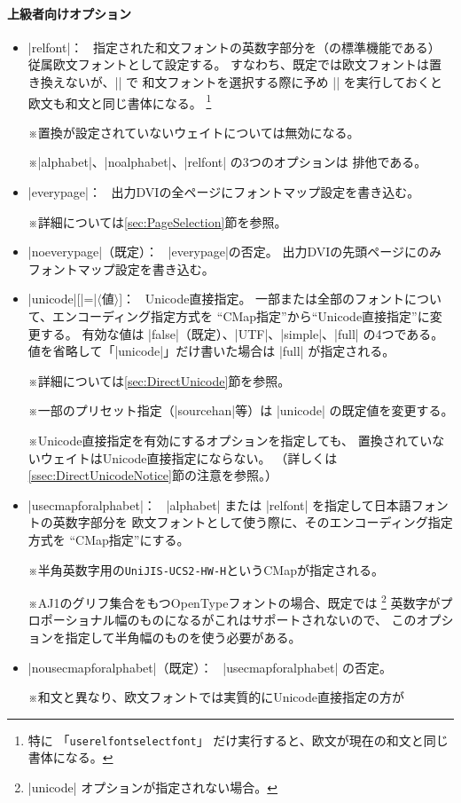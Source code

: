 \documentclass[uplatex,dvipdfmx,a4paper]{jsarticle}
\newcommand{\Meta}[1]{$\langle$\mbox{}#1\mbox{}$\rangle$}
\newcommand{\Note}{\par\noindent ※}
\newcommand{\Means}{：\ }
\providecommand{\Strong}[1]{\textsf{#1}}
\begin{document}
\paragraph{上級者向けオプション}
\begin{itemize}
\item |relfont|\Means
  指定された和文フォントの英数字部分を（{\pLaTeX}の標準機能である）
  \Strong{従属欧文フォント}として設定する。
  すなわち、既定では欧文フォントは置き換えないが、|\selectfont| で
  和文フォントを選択する際に予め |\userelfont| を実行しておくと
  欧文も和文と同じ書体になる。
  \footnote{特に
  「\texttt{userelfontselectfont}」
  だけ実行すると、欧文が現在の和文と同じ書体になる。}
  \Note 置換が設定されていないウェイトについては無効になる。
  \Note |alphabet|、|noalphabet|、|relfont| の3つのオプションは
  排他である。
\item |everypage|\Means
  出力DVIの全ページにフォントマップ設定を書き込む。
  \Note 詳細については\ref{sec:PageSelection}節を参照。
\item |noeverypage|（既定）\Means
  |everypage|の否定。
  出力DVIの先頭ページにのみフォントマップ設定を書き込む。
\item |unicode|[|=|\Meta{値}]\Means
  Unicode直接指定。
  一部または全部のフォントについて、エンコーディング指定方式を
  “CMap指定”から“Unicode直接指定”に変更する。
  有効な値は |false|（既定）、|UTF|、|simple|、|full| の4つである。
  値を省略して「|unicode|」だけ書いた場合は |full| が指定される。
  \Note 詳細については\ref{sec:DirectUnicode}節を参照。
  \Note 一部のプリセット指定（|sourcehan|等）は
  |unicode| の既定値を変更する。
  \Note Unicode直接指定を有効にするオプションを指定しても、
    置換されて\Strong{いない}ウェイトはUnicode直接指定にならない。
    （詳しくは\ref{ssec:DirectUnicodeNotice}節の注意を参照。）
\item |usecmapforalphabet|\Means
  |alphabet| または |relfont| を指定して日本語フォントの英数字部分を
  欧文フォントとして使う際に、そのエンコーディング指定方式を
  “CMap指定”にする。
  \Note 半角英数字用の\texttt{UniJIS-UCS2-HW-H}というCMapが指定される。
  \Note AJ1のグリフ集合をもつOpenTypeフォントの場合、既定では
  \footnote{|unicode| オプションが指定されない場合。}%
  英数字がプロポーショナル幅のものになるがこれはサポートされないので、
  このオプションを指定して半角幅のものを使う必要がある。
\item |nousecmapforalphabet|（既定）\Means
  |usecmapforalphabet| の否定。
  \Note 和文と異なり、欧文フォントでは実質的にUnicode直接指定の方が

\end{itemize}
\end{document}
